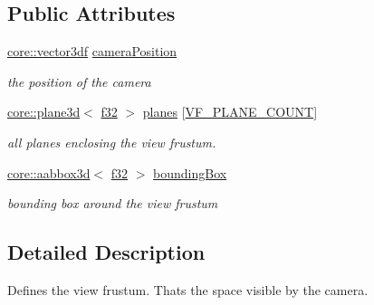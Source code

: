 \subsection*{Public Attributes}
\begin{DoxyCompactItemize}
\item 
\hyperlink{namespaceirr_1_1core_a06f169d08b5c429f5575acb7edbad811}{core\+::vector3df} \hyperlink{structirr_1_1scene_1_1SViewFrustum_a77726fa084f416d69f058a7b2f887545}{camera\+Position}\hypertarget{structirr_1_1scene_1_1SViewFrustum_a77726fa084f416d69f058a7b2f887545}{}\label{structirr_1_1scene_1_1SViewFrustum_a77726fa084f416d69f058a7b2f887545}

\begin{DoxyCompactList}\small\item\em the position of the camera \end{DoxyCompactList}\item 
\hyperlink{classirr_1_1core_1_1plane3d}{core\+::plane3d}$<$ \hyperlink{namespaceirr_a0277be98d67dc26ff93b1a6a1d086b07}{f32} $>$ \hyperlink{structirr_1_1scene_1_1SViewFrustum_afa59258f22c23b6f1dc4bcaff142dba2}{planes} \mbox{[}\hyperlink{structirr_1_1scene_1_1SViewFrustum_ae3a96797aec028717f0589e82926b9f0a6c3c4cb8060a23a2365cf1df46fcefd7}{V\+F\+\_\+\+P\+L\+A\+N\+E\+\_\+\+C\+O\+U\+NT}\mbox{]}\hypertarget{structirr_1_1scene_1_1SViewFrustum_afa59258f22c23b6f1dc4bcaff142dba2}{}\label{structirr_1_1scene_1_1SViewFrustum_afa59258f22c23b6f1dc4bcaff142dba2}

\begin{DoxyCompactList}\small\item\em all planes enclosing the view frustum. \end{DoxyCompactList}\item 
\hyperlink{classirr_1_1core_1_1aabbox3d}{core\+::aabbox3d}$<$ \hyperlink{namespaceirr_a0277be98d67dc26ff93b1a6a1d086b07}{f32} $>$ \hyperlink{structirr_1_1scene_1_1SViewFrustum_ad4c8605ad3494093e3e5860e0332fe8a}{bounding\+Box}\hypertarget{structirr_1_1scene_1_1SViewFrustum_ad4c8605ad3494093e3e5860e0332fe8a}{}\label{structirr_1_1scene_1_1SViewFrustum_ad4c8605ad3494093e3e5860e0332fe8a}

\begin{DoxyCompactList}\small\item\em bounding box around the view frustum \end{DoxyCompactList}\end{DoxyCompactItemize}


\subsection{Detailed Description}
Defines the view frustum. That\textquotesingle{}s the space visible by the camera. 

